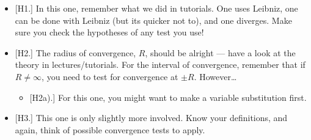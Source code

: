 \documentclass[
  17pt,
  a4paper]{extarticle}
\providecommand{\tightlist}{%
  \setlength{\itemsep}{0pt}\setlength{\parskip}{0pt}}
\theoremstyle{plain}
\theoremstyle{plain}
\theoremstyle{plain}
\theoremstyle{plain}
\theoremstyle{plain}
\theoremstyle{definition}
\theoremstyle{definition}
\theoremstyle{definition}
\theoremstyle{remark}
\renewcommand{\;}{\,}
\begin{document}
\begin{itemize}
\tightlist
\item
  {[}H1.{]} In this one, remember what we did in tutorials. One uses Leibniz, one can be done with Leibniz (but its quicker not to), and one diverges. Make sure you check the hypotheses of any test you use!
\item
  {[}H2.{]} The radius of convergence, \(R\), should be alright --- have a look at the theory in lectures/tutorials. For the interval of convergence, remember that if \(R \neq \infty\), you need to test for convergence at \(\pm R\). However\ldots{}

  \begin{itemize}
  \tightlist
  \item
    {[}H2a).{]} For this one, you might want to make a variable substitution first.
  \end{itemize}
\item
  {[}H3.{]} This one is only slightly more involved. Know your definitions, and again, think of possible convergence tests to apply.
\end{itemize}
\end{document}
